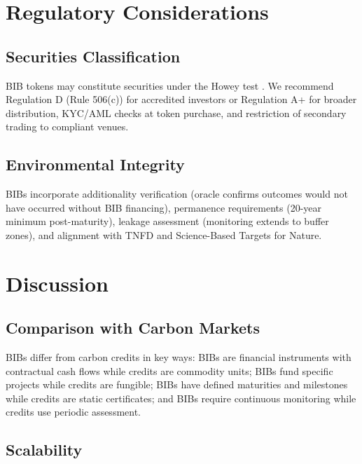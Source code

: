 \documentclass[11pt,a4paper]{article}
\begin{document}
\section{Regulatory Considerations}
\label{sec:regulatory}

\subsection{Securities Classification}

BIB tokens may constitute securities under the Howey test
\citep{sec1946howey}. We recommend Regulation D (Rule 506(c)) for
accredited investors or Regulation A+ for broader distribution,
KYC/AML checks at token purchase, and restriction of secondary trading
to compliant venues.

\subsection{Environmental Integrity}

BIBs incorporate additionality verification (oracle confirms outcomes
would not have occurred without BIB financing), permanence requirements
(20-year minimum post-maturity), leakage assessment (monitoring extends
to buffer zones), and alignment with TNFD \citep{tnfd2023framework} and
Science-Based Targets for Nature.


\section{Discussion}
\label{sec:discussion}

\subsection{Comparison with Carbon Markets}

BIBs differ from carbon credits in key ways: BIBs are financial
instruments with contractual cash flows while credits are commodity
units; BIBs fund specific projects while credits are fungible; BIBs
have defined maturities and milestones while credits are static
certificates; and BIBs require continuous monitoring while credits use
periodic assessment.

\subsection{Scalability}
\end{document}
